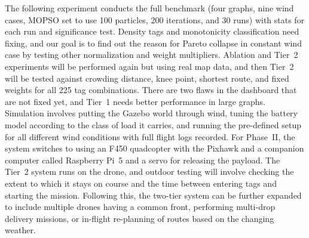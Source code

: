 The following experiment conducts the full benchmark (four graphs, nine wind cases,
MOPSO set to use 100 particles, 200 iterations, and 30 runs) with stats for each run and
significance test. Density tags and monotonicity classification need fixing, and our
goal is to find out the reason for Pareto collapse in constant wind case by testing
other normalization and weight multipliers. Ablation and Tier~2 experiments will be
performed again but using real map data, and then Tier~2 will be tested against
crowding distance, knee point, shortest route, and fixed weights for all 225 tag
combinations. There are two flaws in the dashboard that are not fixed yet, and Tier~1
needs better performance in large graphs. Simulation involves putting the Gazebo world
through wind, tuning the battery model according to the class of load it carries, and
running the pre-defined setup for all different wind conditions with full flight logs
recorded. For Phase~II, the system switches to using an F450 quadcopter with the Pixhawk and a
companion computer called Raspberry Pi~5 and a servo for releasing the payload. The
Tier~2 system runs on the drone, and outdoor testing will involve checking the extent to
which it stays on course and the time between entering tags and starting the mission.
Following this, the two-tier system can be further expanded to include multiple drones
having a common front, performing multi-drop delivery missions, or in-flight
re-planning of routes based on the changing weather.

